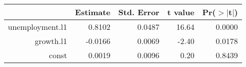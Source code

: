 \begin{table}[ht]
\centering
\begin{tabular}{rrrrr}
  \hline
 & Estimate & Std. Error & t value & Pr($>$$|$t$|$) \\ 
  \hline
unemployment.l1 & 0.8102 & 0.0487 & 16.64 & 0.0000 \\ 
  growth.l1 & -0.0166 & 0.0069 & -2.40 & 0.0178 \\ 
  const & 0.0019 & 0.0096 & 0.20 & 0.8439 \\ 
   \hline
\end{tabular}
\end{table}
